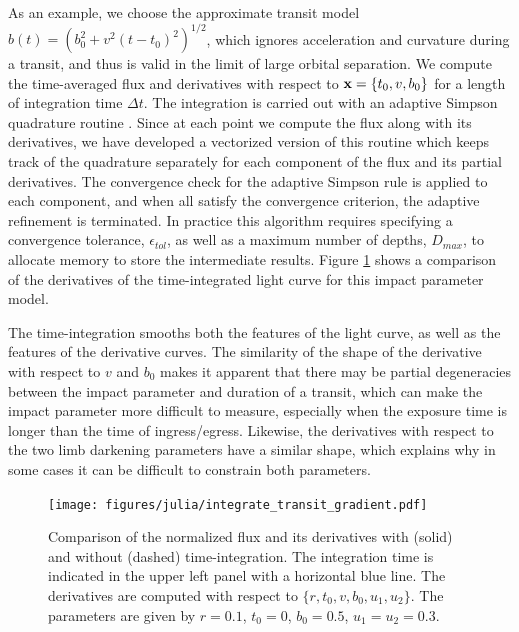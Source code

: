 \documentclass[modern]{aastex61}
\begin{document}
As an example, we choose the approximate transit model $b(t) = (b_0^2 + v^2(t-t_0)^2)^{1/2}$,
which ignores acceleration and curvature during a transit, and thus is valid in the
limit of large orbital separation.  We compute the time-averaged flux and derivatives
with respect to ${\mathbf{x}} = \{t_0,v,b_0\}$ for a length of integration time $\Delta t$.
The integration is carried out with an adaptive Simpson quadrature routine
\citep{Kuncir1962}.  Since at each point we compute the flux along with
its derivatives, we have developed a vectorized version of this routine
which keeps track of the quadrature separately for each component of the
flux and its partial derivatives.  The convergence check for the adaptive
Simpson rule is applied to each component, and when all satisfy the
convergence criterion, the adaptive refinement is terminated.
In practice this algorithm requires specifying a convergence tolerance,
$\epsilon_{tol}$, as well as a maximum number of depths, $D_{max}$, to
allocate memory to store the intermediate results.
Figure \ref{fig:integrated_derivs} shows a
comparison of the derivatives of the time-integrated light curve for this
impact parameter model.

The time-integration smooths both the features of
the light curve, as well as the features of the derivative curves.  The similarity of
the shape of the derivative with respect to $v$ and $b_0$ makes it apparent
that there may be partial degeneracies between the impact parameter and duration
of a transit, which can make the impact parameter more difficult to measure, especially
when the exposure time is longer than the time of ingress/egress.  Likewise, the
derivatives with respect to the two limb darkening parameters have a similar shape,
which explains why in some cases it can be difficult to constrain both parameters.

\begin{figure}
    \begin{centering}
    \texttt{[image: figures/julia/integrate\_transit\_gradient.pdf]}
    \caption{Comparison of the normalized flux and its derivatives with (solid) and
    without (dashed) time-integration.  The integration time is indicated in the
    upper left panel with a horizontal blue line. The derivatives are computed with
    respect to $\{r,t_0,v,b_0,u_1,u_2\}$.  The parameters are given by $r=0.1$,
    $t_0 = 0$, $b_0=0.5$, $u_1=u_2=0.3$. 
    \label{fig:integrated_derivs}}
    \end{centering}
\end{figure}
\end{document}
